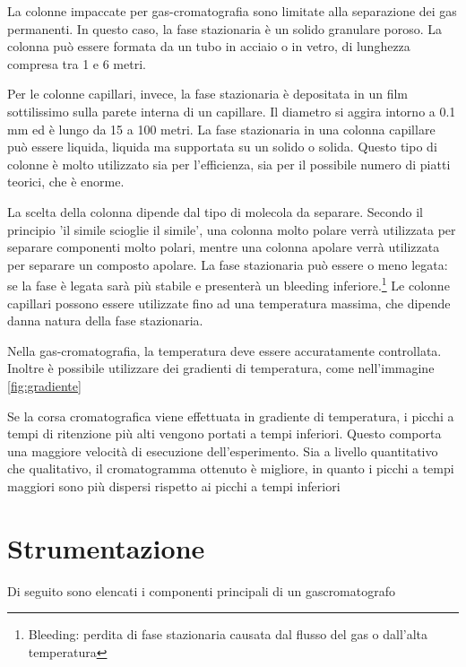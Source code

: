 La colonne impaccate per gas-cromatografia sono limitate alla separazione dei gas permanenti. In questo caso, la fase stazionaria è un solido granulare poroso. La colonna può essere formata da un tubo in acciaio o in vetro, di lunghezza compresa tra 1 e 6 metri.

Per le colonne capillari, invece, la fase stazionaria è depositata in un film sottilissimo sulla parete interna di un capillare. Il diametro si aggira intorno a 0.1 mm ed è lungo da 15 a 100 metri. La fase stazionaria in una colonna capillare può essere liquida, liquida ma supportata su un solido o solida. Questo tipo di colonne è molto utilizzato sia per l'efficienza, sia per il possibile numero di piatti teorici, che è enorme.


La scelta della colonna dipende dal tipo di molecola da separare. Secondo il principio 'il simile scioglie il simile', una colonna molto polare verrà utilizzata per separare componenti molto polari, mentre una colonna apolare verrà utilizzata per separare un composto apolare. La fase stazionaria può essere o meno legata: se la fase è legata sarà più stabile e presenterà un bleeding inferiore.\footnote{Bleeding: perdita di fase stazionaria causata dal flusso del gas o dall'alta temperatura} Le colonne capillari possono essere utilizzate fino ad una temperatura massima, che dipende danna natura della fase stazionaria.

Nella gas-cromatografia, la temperatura deve essere accuratamente controllata. Inoltre è possibile utilizzare dei gradienti di temperatura, come nell'immagine \ref{fig:gradiente}


Se la corsa cromatografica viene effettuata in gradiente di temperatura, i picchi a tempi di ritenzione più alti vengono portati a tempi inferiori. Questo comporta una maggiore velocità di esecuzione dell'esperimento. Sia a livello quantitativo che qualitativo, il cromatogramma ottenuto è migliore, in quanto i picchi a tempi maggiori sono più dispersi rispetto ai picchi a tempi inferiori

\section{Strumentazione}
Di seguito sono elencati i componenti principali di un gascromatografo

